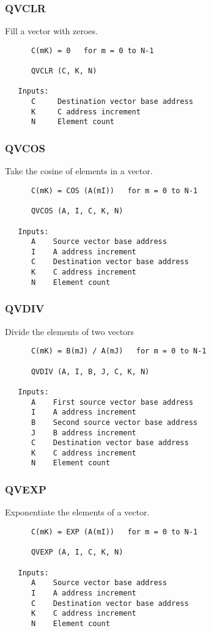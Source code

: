\subsubsection{QVCLR }
Fill a vector with zeroes.

\begin{verbatim}
      C(mK) = 0   for m = 0 to N-1

      QVCLR (C, K, N)

   Inputs:
      C     Destination vector base address
      K     C address increment
      N     Element count

\end{verbatim}
\subsubsection{QVCOS }
Take the cosine of elements in a vector.

\begin{verbatim}
      C(mK) = COS (A(mI))   for m = 0 to N-1

      QVCOS (A, I, C, K, N)

   Inputs:
      A    Source vector base address
      I    A address increment
      C    Destination vector base address
      K    C address increment
      N    Element count

\end{verbatim}
\subsubsection{QVDIV }
Divide the elements of two vectors

\begin{verbatim}
      C(mK) = B(mJ) / A(mJ)   for m = 0 to N-1

      QVDIV (A, I, B, J, C, K, N)

   Inputs:
      A    First source vector base address
      I    A address increment
      B    Second source vector base address
      J    B address increment
      C    Destination vector base address
      K    C address increment
      N    Element count

\end{verbatim}
\subsubsection{QVEXP }
Exponentiate the elements of a vector.

\begin{verbatim}
      C(mK) = EXP (A(mI))   for m = 0 to N-1

      QVEXP (A, I, C, K, N)

   Inputs:
      A    Source vector base address
      I    A address increment
      C    Destination vector base address
      K    C address increment
      N    Element count

\end{verbatim}
